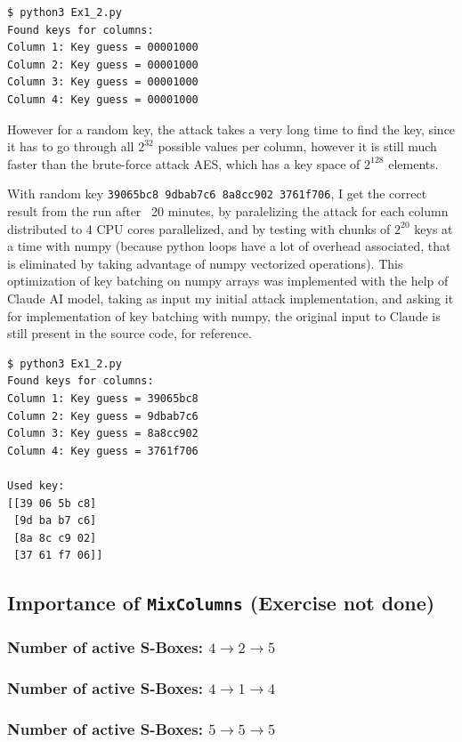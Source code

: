 \documentclass{article}
\begin{document}
\begin{lstlisting}[language=txt]
$ python3 Ex1_2.py
Found keys for columns:
Column 1: Key guess = 00001000
Column 2: Key guess = 00001000
Column 3: Key guess = 00001000
Column 4: Key guess = 00001000
\end{lstlisting}

However for a random key, the attack takes a very long time to find the key, since it has to go through all $2^{32}$ possible values per column, however it is still much faster than the brute-force attack AES, which has a key space of $2^{128}$ elements.

With random key \texttt{39065bc8 9dbab7c6 8a8cc902 3761f706}, I get the correct result from the run after ~20 minutes, by paralelizing the attack for each column distributed to 4 CPU cores parallelized, and by testing with chunks of $2^{20}$ keys at a time with numpy (because python loops have a lot of overhead associated, that is eliminated by taking advantage of numpy vectorized operations).
This optimization of key batching on numpy arrays was implemented with the help of Claude AI model, taking as input my initial attack implementation, and asking it for implementation of key batching with numpy, the original input to Claude is still present in the source code, for reference.

\begin{lstlisting}[language=txt]
$ python3 Ex1_2.py
Found keys for columns:
Column 1: Key guess = 39065bc8
Column 2: Key guess = 9dbab7c6
Column 3: Key guess = 8a8cc902
Column 4: Key guess = 3761f706

Used key:
[[39 06 5b c8]
 [9d ba b7 c6]
 [8a 8c c9 02]
 [37 61 f7 06]]
\end{lstlisting}

\subsection{Importance of \texttt{MixColumns} (Exercise not done)}
\subsubsection{Number of active S-Boxes: $4 \rightarrow 2 \rightarrow 5$}
\subsubsection{Number of active S-Boxes: $4 \rightarrow 1 \rightarrow 4$}
\subsubsection{Number of active S-Boxes: $5 \rightarrow 5 \rightarrow 5$}
\end{document}
